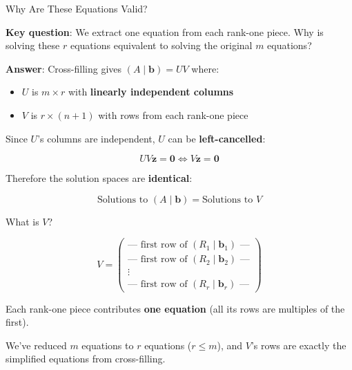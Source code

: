 \documentclass[10pt]{beamer}
\theoremstyle{definition}
\newcommand{\x}[1]{\alert{\textbf{#1}}}
\begin{document}
\begin{frame}{Why Are These Equations Valid?}

\x{Key question}: We extract one equation from each rank-one piece. Why is solving these $r$ equations equivalent to solving the original $m$ equations?

\vspace{1em}

\x{Answer}: Cross-filling gives $(A \mid \mathbf{b}) = UV$ where:
\begin{itemize}
\item $U$ is $m \times r$ with \textbf{linearly independent columns}
\item $V$ is $r \times (n+1)$ with rows from each rank-one piece
\end{itemize}

\vspace{0.5em}

Since $U$'s columns are independent, $U$ can be \x{left-cancelled}:

$$UV\mathbf{z} = \mathbf{0} \iff V\mathbf{z} = \mathbf{0}$$

Therefore the solution spaces are \x{identical}:

$$\text{Solutions to } (A \mid \mathbf{b}) = \text{Solutions to } V$$

\end{frame}

\begin{frame}{What is $V$?}

$$V = \begin{pmatrix}
\text{— first row of } (R_1 \mid \mathbf{b}_1) \text{ —} \\
\text{— first row of } (R_2 \mid \mathbf{b}_2) \text{ —} \\
\vdots \\
\text{— first row of } (R_r \mid \mathbf{b}_r) \text{ —}
\end{pmatrix}$$

\vspace{1em}

Each rank-one piece contributes \x{one equation} (all its rows are multiples of the first).

\vspace{1em}

We've reduced $m$ equations to $r$ equations ($r \leq m$), and $V$'s rows are exactly the simplified equations from cross-filling.

\end{frame}
\end{document}

